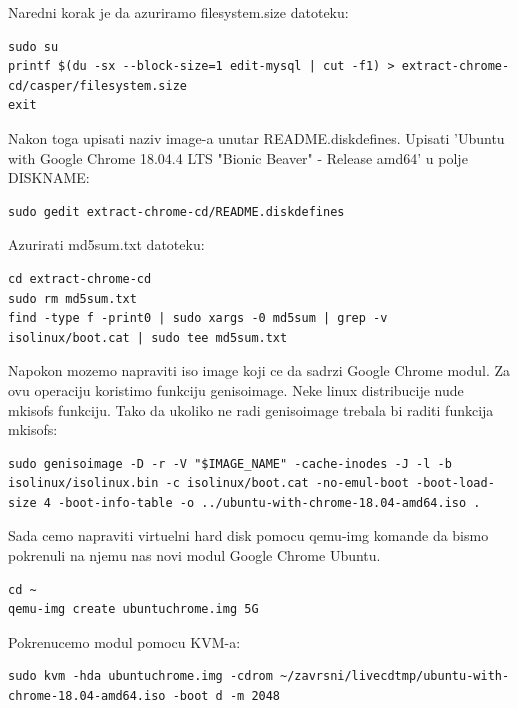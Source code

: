 \documentclass[12pt,vi]{mitthesis}
\begin{document}
\noindent
Naredni korak je da azuriramo filesystem.size datoteku:
\begin{lstlisting}[style=BashInputStyle]
sudo su
printf $(du -sx --block-size=1 edit-mysql | cut -f1) > extract-chrome-cd/casper/filesystem.size
exit
\end{lstlisting}

\noindent
Nakon toga upisati naziv image-a unutar README.diskdefines. 
Upisati 'Ubuntu with Google Chrome 18.04.4 LTS "Bionic Beaver" - Release amd64' u polje DISKNAME:
\begin{lstlisting}[style=BashInputStyle]
sudo gedit extract-chrome-cd/README.diskdefines
\end{lstlisting}

\noindent
Azurirati md5sum.txt datoteku:
\begin{lstlisting}[style=BashInputStyle]
cd extract-chrome-cd
sudo rm md5sum.txt
find -type f -print0 | sudo xargs -0 md5sum | grep -v isolinux/boot.cat | sudo tee md5sum.txt
\end{lstlisting}

\noindent
Napokon mozemo napraviti iso image koji ce da sadrzi Google Chrome modul. Za ovu operaciju koristimo funkciju genisoimage. Neke linux distribucije nude mkisofs funkciju. Tako da ukoliko ne radi genisoimage trebala bi raditi funkcija mkisofs:
\begin{lstlisting}[style=BashInputStyle]
sudo genisoimage -D -r -V "$IMAGE_NAME" -cache-inodes -J -l -b isolinux/isolinux.bin -c isolinux/boot.cat -no-emul-boot -boot-load-size 4 -boot-info-table -o ../ubuntu-with-chrome-18.04-amd64.iso .
\end{lstlisting}

\noindent
Sada cemo napraviti virtuelni hard disk pomocu qemu-img komande da bismo pokrenuli na njemu nas novi modul Google Chrome Ubuntu.
\begin{lstlisting}[style=BashInputStyle]
cd ~
qemu-img create ubuntuchrome.img 5G
\end{lstlisting}

\noindent 
Pokrenucemo modul pomocu KVM-a:
\begin{lstlisting}[style=BashInputStyle]
sudo kvm -hda ubuntuchrome.img -cdrom ~/zavrsni/livecdtmp/ubuntu-with-chrome-18.04-amd64.iso -boot d -m 2048
\end{lstlisting}

\end{document}

